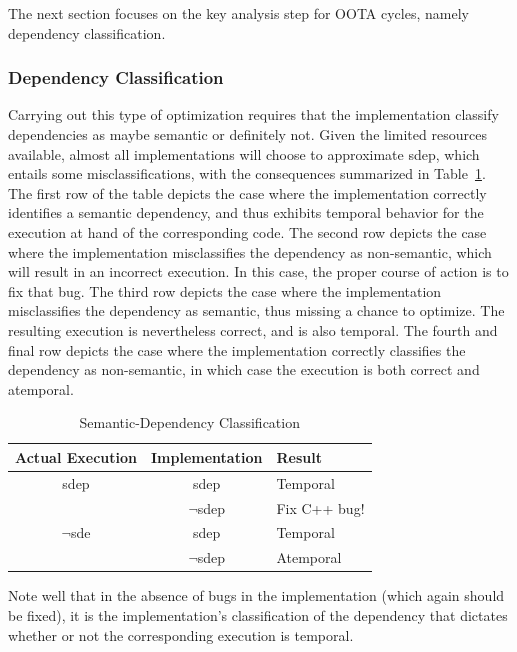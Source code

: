 \documentclass[10]{article}
\begin{document}
The next section focuses on the key analysis step for OOTA cycles,
namely dependency classification.

\subsubsection{Dependency Classification}
\label{sec:Dependency Classification}

Carrying out this type of optimization requires that the implementation
classify dependencies as maybe semantic or definitely not.
Given the limited resources available, almost all implementations will
choose to approximate sdep, which entails some misclassifications, with
the consequences summarized in
Table~\ref{tab:Semantic-Dependency Classification}.
The first row of the table depicts the case where the implementation
correctly identifies a semantic dependency, and thus exhibits temporal
behavior for the execution at hand of the corresponding code.
The second row depicts the case where the implementation misclassifies
the dependency as non-semantic, which will result in an incorrect
execution.
In this case, the proper course of action is to fix that bug.
The third row depicts the case where the implementation misclassifies
the dependency as semantic, thus missing a chance to optimize.
The resulting execution is nevertheless correct, and is also temporal.
The fourth and final row depicts the case where the implementation
correctly classifies the dependency as non-semantic, in which case
the execution is both correct and atemporal.

\begin{table}
\centering
\begin{tabular}{c|c|l}
Actual Execution	& Implementation	& Result \\
\hline
sdep			& sdep			& Temporal \\
\cline{2-3}
			& $\neg$sdep		& Fix C++ bug! \\
\hline
$\neg$sde		& sdep			& Temporal \\
\cline{2-3}
			& $\neg$sdep		& Atemporal \\
\end{tabular}
\caption{Semantic-Dependency Classification}
\label{tab:Semantic-Dependency Classification}
\end{table}

Note well that in the absence of bugs in the implementation (which
again should be fixed), it is the implementation's classification of
the dependency that dictates whether or not the corresponding execution
is temporal.
\end{document}

